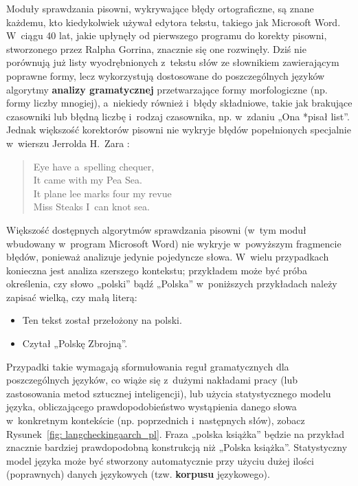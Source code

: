 \begin{multicols}{2}
Moduły sprawdzania pisowni, wykrywające błędy ortograficzne, są
znane każdemu, kto kiedykolwiek używał edytora tekstu, takiego jak
Microsoft Word. W~ciągu 40 lat, jakie upłynęły od pierwszego
programu do korekty pisowni, stworzonego przez Ralpha Gorrina,
znacznie się one rozwinęły. Dziś nie porównują już listy
wyodrębnionych z~tekstu słów ze słownikiem zawierającym poprawne
formy, lecz wykorzystują dostosowane do poszczególnych języków
algorytmy \textbf{analizy gramatycznej} przetwarzające formy
morfologiczne (np. formy liczby mnogiej), a~niekiedy również
i~błędy składniowe, takie jak brakujące czasowniki lub błędną
liczbę i~rodzaj czasownika, np. w~zdaniu „Ona *pisał list”.
Jednak większość korektorów pisowni nie wykryje błędów
popełnionych specjalnie w~wierszu Jerrolda H.~Zara \cite{zar1}: 

\begin{verse} Eye have a~spelling chequer,\\
It came with my Pea Sea.\\
It plane lee marks four my revue\\
Miss Steaks I~can knot sea. \end{verse} 

Większość dostępnych algorytmów sprawdzania pisowni (w~tym moduł
wbudowany w~program Microsoft Word) nie wykryje w~powyższym
fragmencie błędów, ponieważ analizuje jedynie pojedyncze słowa.
W~wielu przypadkach konieczna jest analiza szerszego kontekstu;
przykładem może być próba określenia, czy słowo „polski”
bądź „Polska” w~poniższych przykładach należy zapisać
wielką, czy małą literą: 

\begin{itemize} \item Ten tekst został przełożony na polski. \item
Czytał „Polskę Zbrojną”. \end{itemize} 

Przypadki takie wymagają sformułowania reguł gramatycznych dla
poszczególnych języków, co wiąże się z~dużymi nakładami pracy
(lub zastosowania metod sztucznej inteligencji), lub użycia
statystycznego modelu języka, obliczającego prawdopodobieństwo
wystąpienia danego słowa w~konkretnym kontekście (np. poprzednich
i~następnych słów), zobacz Rysunek~\ref{fig: langcheckingaarch_pl}.
Fraza „polska książka” będzie na przykład znacznie bardziej
prawdopodobną konstrukcją niż „Polska książka”. Statystyczny
model języka może być stworzony automatycznie przy użyciu dużej
ilości (poprawnych) danych językowych (tzw. \textbf{korpusu}
językowego). 


\end{multicols}
